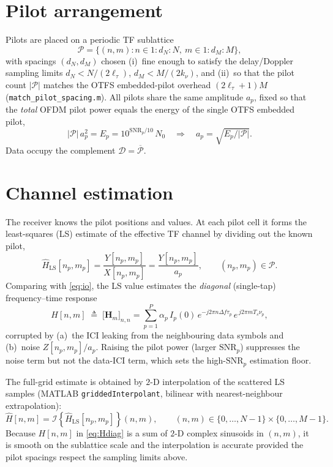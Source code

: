 \documentclass[11pt]{article}
\newcommand{\df}{\Delta f}
\begin{document}
\section{Pilot arrangement}

Pilots are placed on a periodic TF sublattice
\begin{equation}
  \mathcal{P}=\{(n,m): n\in 1{:}d_N{:}N,\ m\in 1{:}d_M{:}M\},
\end{equation}
with spacings $(d_N,d_M)$ chosen (i)~fine enough to satisfy the
delay/Doppler sampling limits $d_N<N/(2\ell_\tau)$, $d_M<M/(2k_\nu)$, and
(ii)~so that the pilot count $|\mathcal{P}|$ matches the OTFS embedded-pilot
overhead $(2\ell_\tau+1)M$ (\texttt{match\_pilot\_spacing.m}). All pilots share
the same amplitude $a_p$, fixed so that the \emph{total} OFDM pilot power equals
the energy of the single OTFS embedded pilot,
\begin{equation}
  |\mathcal{P}|\,a_p^2=E_p=10^{\mathrm{SNR}_p/10}\,N_0
  \quad\Longrightarrow\quad
  a_p=\sqrt{E_p/|\mathcal{P}|}.
  \label{eq:pilotpow}
\end{equation}
Data occupy the complement $\mathcal{D}=\overline{\mathcal{P}}$.

\section{Channel estimation}

The receiver knows the pilot positions and values. At each pilot cell it forms
the least-squares (LS) estimate of the effective TF channel by dividing out the
known pilot,
\begin{equation}
  \widehat{H}_{\mathrm{LS}}[n_p,m_p]=\frac{Y[n_p,m_p]}{X[n_p,m_p]}
   =\frac{Y[n_p,m_p]}{a_p},\qquad (n_p,m_p)\in\mathcal{P}.
  \label{eq:ls}
\end{equation}
Comparing with \eqref{eq:io}, the LS value estimates the \emph{diagonal}
(single-tap) frequency--time response
\begin{equation}
  H[n,m]\;\triangleq\;\big[\bm H_m\big]_{n,n}
   =\sum_{p=1}^{P}\alpha_p\,I_p(0)\,
      e^{-j2\pi n\df\tau_p}\,e^{\,j2\pi m T_s\nu_p},
  \label{eq:Hdiag}
\end{equation}
corrupted by (a)~the ICI leaking from the neighbouring data symbols and
(b)~noise $Z[n_p,m_p]/a_p$. Raising the pilot power (larger $\mathrm{SNR}_p$)
suppresses the noise term but not the data-ICI term, which sets the
high-$\mathrm{SNR}_p$ estimation floor.

The full-grid estimate is obtained by $2$-D interpolation of the scattered LS
samples (MATLAB \texttt{griddedInterpolant}, bilinear with nearest-neighbour
extrapolation):
\begin{equation}
  \widehat{H}[n,m]=\mathcal{I}\!\left\{\widehat{H}_{\mathrm{LS}}[n_p,m_p]\right\}(n,m),
  \qquad (n,m)\in\{0,\dots,N-1\}\times\{0,\dots,M-1\}.
  \label{eq:interp}
\end{equation}
Because $H[n,m]$ in \eqref{eq:Hdiag} is a sum of $2$-D complex sinusoids in
$(n,m)$, it is smooth on the sublattice scale and the interpolation is accurate
provided the pilot spacings respect the sampling limits above.
\end{document}
